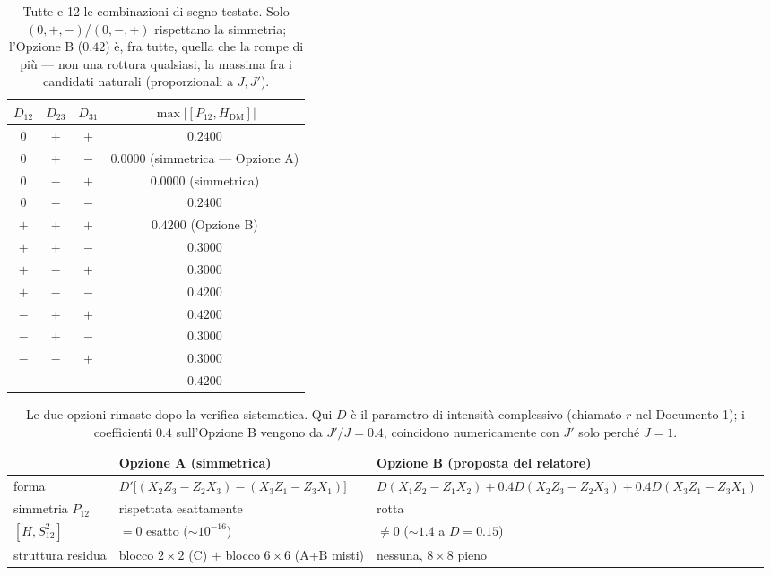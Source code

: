 \documentclass[11pt,a4paper]{article}
\begin{document}
\begin{table}[htbp]
\centering
\small
\renewcommand{\arraystretch}{1.25}
\begin{tabular}{@{}cccc@{}}
\toprule
\rowcolor{grigetto}
$D_{12}$ & $D_{23}$ & $D_{31}$ & $\max|[P_{12},H_\text{DM}]|$ \\
\midrule
$0$ & $+$ & $+$ & $0.2400$ \\
$0$ & $+$ & $-$ & $\mathbf{0.0000}$ \quad (simmetrica --- Opzione A) \\
$0$ & $-$ & $+$ & $\mathbf{0.0000}$ \quad (simmetrica) \\
$0$ & $-$ & $-$ & $0.2400$ \\
$+$ & $+$ & $+$ & $0.4200$ \quad (Opzione B) \\
$+$ & $+$ & $-$ & $0.3000$ \\
$+$ & $-$ & $+$ & $0.3000$ \\
$+$ & $-$ & $-$ & $0.4200$ \\
$-$ & $+$ & $+$ & $0.4200$ \\
$-$ & $+$ & $-$ & $0.3000$ \\
$-$ & $-$ & $+$ & $0.3000$ \\
$-$ & $-$ & $-$ & $0.4200$ \\
\bottomrule
\end{tabular}
\caption{Tutte e 12 le combinazioni di segno testate. Solo
$(0,+,-)$/$(0,-,+)$ rispettano la simmetria; l'Opzione B ($0.42$) è, fra
tutte, quella che la rompe di più --- non una rottura qualsiasi, la
massima fra i candidati naturali (proporzionali a $J,J'$).}
\end{table}
\FloatBarrier

\begin{table}[htbp]
\centering
\renewcommand{\arraystretch}{1.4}
\begin{tabular}{@{}p{2.3cm}p{6.3cm}p{6.3cm}@{}}
\toprule
\rowcolor{grigetto}
& \textbf{Opzione A} (simmetrica) & \textbf{Opzione B} (proposta del relatore) \\
\midrule
forma & $D'\big[(X_2Z_3{-}Z_2X_3)-(X_3Z_1{-}Z_3X_1)\big]$ &
$D(X_1Z_2{-}Z_1X_2)+0.4D(X_2Z_3{-}Z_2X_3)+0.4D(X_3Z_1{-}Z_3X_1)$ \\
simmetria $P_{12}$ & rispettata esattamente & rotta \\
$[H,S_{12}^2]$ & $=0$ esatto ($\sim10^{-16}$) & $\neq0$ ($\sim1.4$ a
$D{=}0.15$) \\
struttura residua & blocco $2{\times}2$ (C) $+$ blocco $6{\times}6$
(A+B misti) & nessuna, $8\times8$ pieno \\
\bottomrule
\end{tabular}
\caption{Le due opzioni rimaste dopo la verifica sistematica. Qui $D$ è il
parametro di intensità complessivo (chiamato $r$ nel Documento 1); i
coefficienti $0.4$ sull'Opzione B vengono da $J'/J=0.4$, coincidono
numericamente con $J'$ solo perché $J=1$.}
\end{table}
\FloatBarrier
\end{document}
